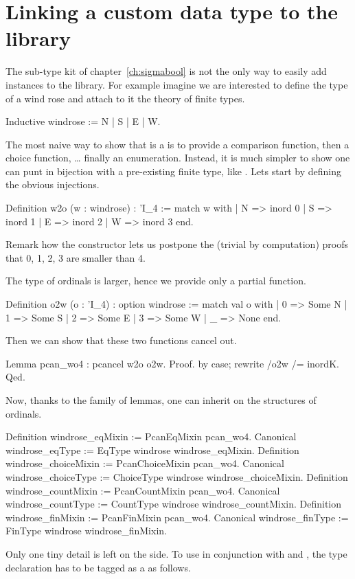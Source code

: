 \section{Linking a custom data type to the library}

The sub-type kit of chapter~\ref{ch:sigmabool} is not the only
way to easily add instances to the library.  For example
imagine we are interested to define the type of a wind rose and attach
to it the theory of finite types.

\begin{coq}{}{}
Inductive windrose := N | S | E | W.
\end{coq}
The most naive way to show that  is a  is
to provide a comparison function, then a choice function, \ldots
finally an enumeration.  Instead, it is much simpler to show one
can punt  in bijection with a pre-existing finite type,
like .  Lets start by defining the obvious injections.

\begin{coq}{}{}
Definition w2o (w : windrose) : 'I_4 :=
  match w with
  | N => inord 0 | S => inord 1 | E => inord 2 | W => inord 3
  end.
\end{coq}
Remark how the  constructor lets us postpone
the (trivial by computation) proofs that 0, 1, 2, 3
are smaller than 4.

The type of ordinals is larger, hence we provide only a partial
function.

\begin{coq}{}{}
Definition o2w (o : 'I_4) : option windrose :=
  match val o with
  | 0 => Some N | 1 => Some S | 2 => Some E | 3 => Some W
  | _ => None
  end.	
\end{coq}
Then we can show that these two functions cancel out.

\begin{coq}{}{}
Lemma pcan_wo4 : pcancel w2o o2w.
Proof. by case; rewrite /o2w /= inordK. Qed.
\end{coq}
Now, thanks to the  family of lemmas, one
can inherit on  the structures of ordinals.

\begin{coq}{}{}
Definition windrose_eqMixin := PcanEqMixin pcan_wo4.
Canonical windrose_eqType := EqType windrose windrose_eqMixin.
Definition windrose_choiceMixin := PcanChoiceMixin pcan_wo4.
Canonical windrose_choiceType := ChoiceType windrose windrose_choiceMixin.
Definition windrose_countMixin := PcanCountMixin pcan_wo4.
Canonical windrose_countType := CountType windrose windrose_countMixin.
Definition windrose_finMixin := PcanFinMixin pcan_wo4.
Canonical windrose_finType := FinType windrose windrose_finMixin.	
\end{coq}
Only one tiny detail is left on the side.  To use 
in conjunction with \C{\\in} and , the type declaration has
to be tagged as a  as follows.

